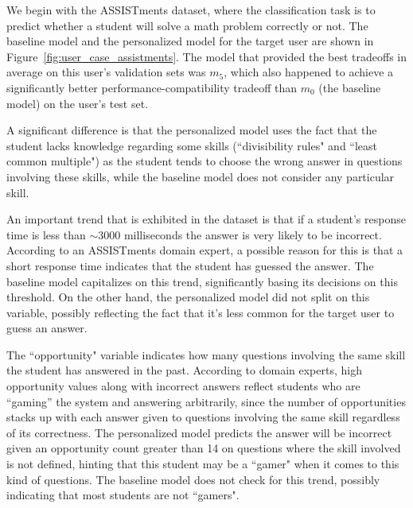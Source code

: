 \documentclass[letterpaper]{article} %
\theoremstyle{definition}
\begin{document}
We begin with the ASSISTments dataset, where the classification task is to predict whether a student will solve a math problem correctly or not.  The baseline model and the personalized model for the target user are shown in Figure~\ref{fig:user_case_assistments}. 
The model that provided the best tradeoffs in average on this user's validation sets was $m_5$, which also happened to achieve a significantly better performance-compatibility tradeoff than $m_0$ (the baseline model) on the user's test set.  


A significant difference is that the personalized model uses the fact that the student lacks knowledge regarding some skills (``divisibility rules" and ``least common multiple") as the student tends to choose the wrong answer in questions involving these skills, while the baseline model does not consider any particular skill.

An important  trend that is  exhibited in  the dataset is that if a student's response time is less than $\sim$3000 milliseconds the answer is very likely to be incorrect.
According to an ASSISTments domain expert, a possible reason for this is that a short response time indicates that the student has guessed the answer.  
The baseline model capitalizes on this trend, significantly basing its decisions on this threshold.
On the other hand, the personalized model did not split on this variable, possibly reflecting the fact that it's less common for the target user to guess an answer. 
     
The ``opportunity" variable indicates how many questions involving the same skill the student has answered in the past.
According to domain experts, high opportunity values along with incorrect answers reflect students who are ``gaming'' the system and answering arbitrarily, since the number of opportunities stacks up with each answer given to questions involving the same skill regardless of its correctness.
The personalized model predicts the answer will be incorrect given an opportunity count greater than 14 on questions where the skill involved is not defined, hinting that this student may be a ``gamer" when it comes to this kind of questions. The baseline model does not check for this trend, possibly indicating that most students are not ``gamers".
\end{document}
